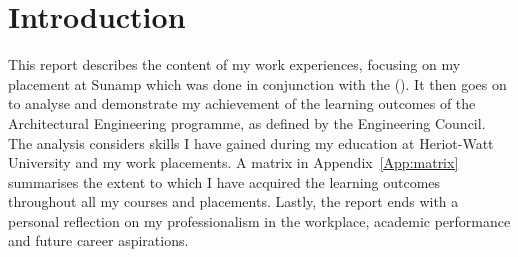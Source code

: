 \chapter{Introduction} %

\label{Chapter1} %


This report describes the content of my work experiences, focusing on my placement at Sunamp which was done in conjunction with the \IPTitle \space (\IP).
It then goes on to analyse and demonstrate my achievement of the learning outcomes of the Architectural Engineering programme, as defined by the Engineering Council.
The analysis considers skills I have gained during my education at Heriot-Watt University and my work placements.
A matrix in Appendix~\ref{App:matrix} summarises the extent to which I have acquired the learning outcomes throughout all my courses and placements.
Lastly, the report ends with a personal reflection on my professionalism in the workplace, academic performance and future career aspirations.